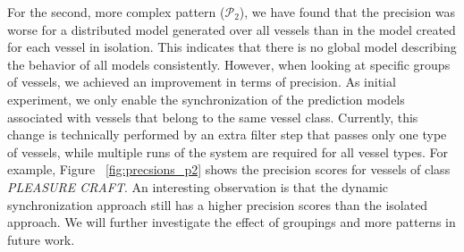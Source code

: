 \par For the second, more complex pattern ($\mathcal{P}_2$), we have found that the precision was worse for a distributed model generated over all vessels than in the model created for each vessel in isolation. This indicates that there is no  global model describing the behavior of all models consistently. However, when looking at specific groups of vessels, we achieved an improvement in terms of precision. As initial experiment, we only enable the synchronization of the prediction models associated with vessels that belong to the same vessel class. Currently, this change is technically performed by an extra filter step that passes only one type of vessels, while multiple runs of the system are required for all vessel types. For example, Figure ~\ref{fig:precsions_p2} shows the precision scores for vessels of class \textit{PLEASURE CRAFT}. An interesting observation is that the dynamic synchronization approach still has  a higher precision scores than the isolated approach. We will further investigate the effect of groupings and more patterns in future work.































%


 
